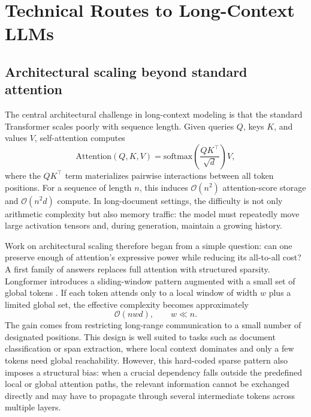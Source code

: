 \documentclass{article}
\begin{document}
\section{Technical Routes to Long-Context LLMs}
\label{sec:survey}

\subsection{Architectural scaling beyond standard attention}
The central architectural challenge in long-context modeling is that the standard Transformer scales poorly with sequence length. Given queries $Q$, keys $K$, and values $V$, self-attention computes
\begin{equation}
\mathrm{Attention}(Q,K,V)=\mathrm{softmax}\left(\frac{QK^\top}{\sqrt{d}}\right)V,
\end{equation}
where the $QK^\top$ term materializes pairwise interactions between all token positions. For a sequence of length $n$, this induces $\mathcal{O}(n^2)$ attention-score storage and $\mathcal{O}(n^2 d)$ compute. In long-document settings, the difficulty is not only arithmetic complexity but also memory traffic: the model must repeatedly move large activation tensors and, during generation, maintain a growing history.

Work on architectural scaling therefore began from a simple question: can one preserve enough of attention's expressive power while reducing its all-to-all cost? A first family of answers replaces full attention with structured sparsity. Longformer introduces a sliding-window pattern augmented with a small set of global tokens \citep{beltagy2020longformer}. If each token attends only to a local window of width $w$ plus a limited global set, the effective complexity becomes approximately
\begin{equation}
\mathcal{O}(nwd), \qquad w \ll n.
\end{equation}
The gain comes from restricting long-range communication to a small number of designated positions. This design is well suited to tasks such as document classification or span extraction, where local context dominates and only a few tokens need global reachability. However, this hard-coded sparse pattern also imposes a structural bias: when a crucial dependency falls outside the predefined local or global attention paths, the relevant information cannot be exchanged directly and may have to propagate through several intermediate tokens across multiple layers.
\end{document}
